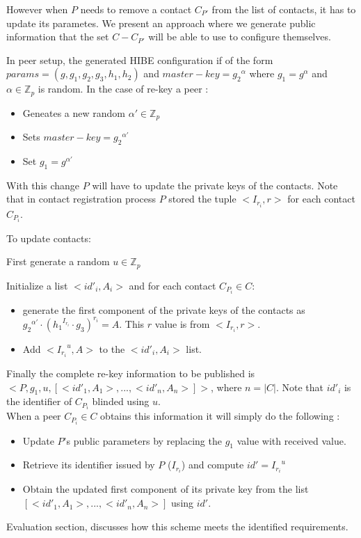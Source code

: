 However when $P$ needs to remove a contact $C_{P'}$ from the list of contacts, it has to update its parametes. We present an approach where we generate public information that the set $C - C_{P'}$ will be able to use to configure themselves.

In peer setup, the generated HIBE configuration if of the form  $params = (g, g_1, g_2, g_3, h_1, h_2)$ and $master-key = {g_2}^{\alpha}$ where $g_1 = g^{\alpha}$ and $\alpha \in \mathbb{Z}_p$ is random. In the case of re-key a peer :
\begin{itemize}
\item Geneates a new random $\alpha' \in \mathbb{Z}_p$
\item Sets $master-key = {g_2}^{\alpha'}$
\item Set $g_1 = g^{\alpha'}$
\end{itemize}

With this change $P$ will have to update the private keys of the contacts. Note that in contact registration process $P$ stored the tuple $<I_{r_i}, r>$ for each contact $C_{P_i}$. 

To update contacts:

First generate a random $u \in \mathbb{Z}_p$

Initialize a list $<{id'}_i, A_i>$ and for each contact $C_{P_i} \in C$:
\begin{itemize}
\item generate the first component of the private keys of the contacts as ${{g_2}^{\alpha'}} \cdot {({{h_1}^{I_{r_i}}} \cdot {g_3} )}^{r_i} = A$. This $r$ value is from $<I_{r_i}, r>$.
\item Add  $<{{I_{r_i}}^u}, A>$ to the $<{id'}_i, A_i>$ list.
\end{itemize}

Finally the complete re-key information to be published is $<P, g_1, u, [<{id'}_1, A_1>, ...,  <{id'}_n, A_n>]>$, where $n = |C|$. Note that ${id'}_i$ is the identifier of $C_{P_i}$ blinded using $u$.\\

When a peer $C_{P_i} \in C$ obtains this information it will simply do the following :
\begin{itemize}
\item Update $P$'s public parameters by replacing the $g_1$ value with received value.
\item Retrieve its identifier issued by $P$ ($I_{r_i}$) and compute $id' = {I_{r_i}}^u$
\item Obtain the updated first component of its private key from the list $[<{id'}_1, A_1>, ...,  <{id'}_n, A_n>]$ using $id'$.\\
\end{itemize}

Evaluation section, discusses how this scheme meets the identified requirements.
